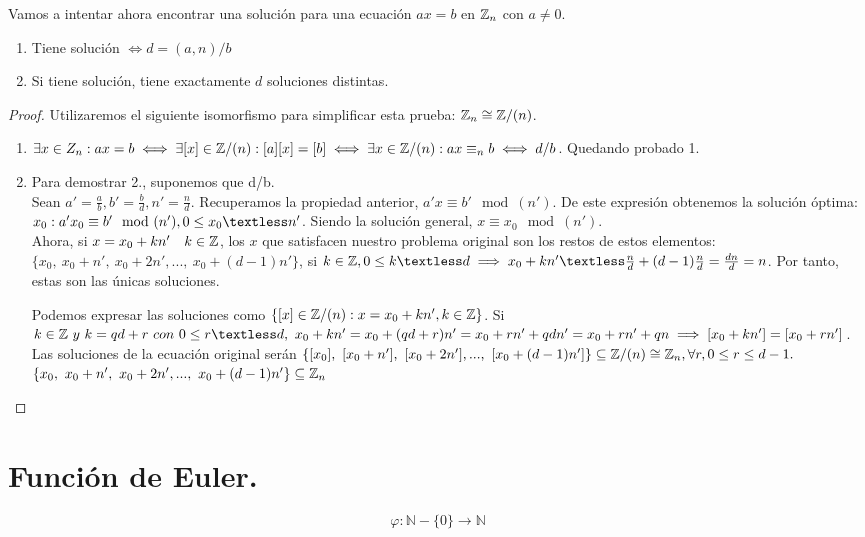 Vamos a intentar ahora encontrar una solución para una ecuación $ax = b$ en $\mathbb{Z}_n$ con $a \ne 0$.

\begin{enumerate}
	\item Tiene solución $\iff d =(a,n)/b$

	\item Si tiene solución, tiene exactamente $d$ soluciones distintas.
\end{enumerate}

\begin{proof}
Utilizaremos el siguiente isomorfismo para simplificar esta prueba: $\mathbb{Z}_n \cong \mathbb{Z}/(n)$.\\
\begin{enumerate}
	\item $\exists x \in Z_n :  ax = b \iff \exists[x] \in \mathbb{Z}/(n) : [a][x] = [b] \iff \exists x \in \mathbb{Z} /(n) : ax \equiv_n b \iff d/b$. Quedando probado 1.
	\item  Para demostrar 2., suponemos que d/b.\\
	 Sean $a' = \frac{a}{b}, b' = \frac{b}{d}, n' = \frac{n}{d}$. Recuperamos la propiedad anterior, $a'x \equiv b'\mod(n')$. De este expresión obtenemos la solución óptima: $x_0 : a'x_0 \equiv b'\mod(n'), 0 \le x_0 \textless n'$. Siendo la solución general, $x \equiv x_0 \mod(n')$.\\
Ahora, si $x = x_0 + kn' \quad k \in \mathbb{Z}$, los $x$ que satisfacen nuestro problema original son los restos de estos elementos:\quad $\{x_0,\ x_0 + n',\ x_0 +2n',...,\ x_0 + (d-1)n'\}$, si $k \in \ent, 0 \le k \textless d \implies x_0 + kn' \textless \frac{n}{d} + (d-1)\frac{n}{d} = \frac{dn}{d} = n$. Por tanto, estas son las únicas soluciones.

Podemos expresar las soluciones como $\{ [x] \in \mathbb{Z} /(n) : x = x_0 + kn', k \in \mathbb{Z}\}$. Si $k \in \ent \ y \ k = qd + r \ con \ 0 \le r \textless d, \ x_0 + kn' = x_0 + (qd + r)n' = x_0 + rn' + qdn'= x_0 + rn' +qn \implies [x_0 + kn'] = [x_0 + rn']$. Las soluciones de la ecuación original serán $\{[x_0],\ [x_0 + n'],\ [x_0 +2n'],...,\ [x_0 + (d-1)n']\} \subseteq \mathbb{Z} /(n) \cong \mathbb{Z} _n, \forall r, 0 \le r \le d - 1.$
$\{x_0,\ x_0 + n',\ x_0 +2n',...,\ x_0 + (d-1)n'\} \subseteq \mathbb{Z} _n$
\end{enumerate}



\end{proof}

\section{Función de Euler.}
\[
  \varphi : \mathbb{N}-\{0\} \longrightarrow \mathbb{N}
\]

